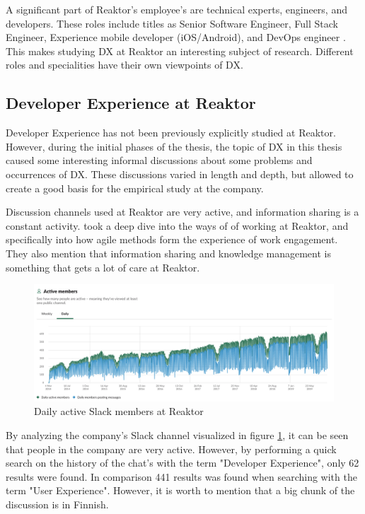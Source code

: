 \documentclass[english, 12pt, a4paper, sci, utf8, a-1b, online]{aaltothesis}
\begin{document}
A significant part of Reaktor's employee's are technical experts, engineers, and developers. These roles include titles as Senior Software Engineer, Full Stack Engineer, Experience mobile developer (iOS/Android), and DevOps engineer \citep{reaktor-careers}. This makes studying DX at Reaktor an interesting subject of research. Different roles and specialities have their own viewpoints of DX.

\subsection{Developer Experience at Reaktor}

Developer Experience has not been previously explicitly studied at Reaktor. However, during the initial phases of the thesis, the topic of DX in this thesis caused some interesting informal discussions about some problems and occurrences of DX. These discussions varied in length and depth, but allowed to create a good basis for the empirical study at the company.

Discussion channels used at Reaktor are very active, and information sharing is a constant activity. \citet{thesis-nelli-vilkko} took a deep dive into the ways of of working at Reaktor, and specifically into how agile methods form the experience of work engagement. They also mention that information sharing and knowledge management is something that gets a lot of care at Reaktor.

\begin{figure}[ht]
  \captionsetup{width=1\textwidth}
  \caption{Daily active Slack members at Reaktor}
  \begin{center}
    \includegraphics[width=1\textwidth]{daily-active-slack-members.png}
  \end{center}
  \label{figure:slack-members}
\end{figure}

By analyzing the company's Slack channel visualized in figure \ref{figure:slack-members}, it can be seen that people in the company are very active. However, by performing a quick search on the history of the chat's with the term "Developer Experience", only 62 results were found. In comparison 441 results was found when searching with the term "User Experience". However, it is worth to mention that a big chunk of the discussion is in Finnish.
\end{document}
